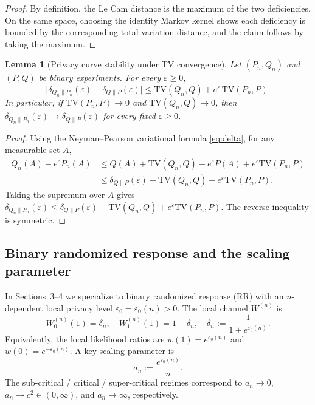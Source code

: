 \documentclass{article}
\newtheorem{lemma}[theorem]{Lemma}
\begin{document}
\begin{proof}
By definition, the Le Cam distance is the maximum of the two deficiencies. On the same space,
choosing the identity Markov kernel shows each deficiency is bounded by the corresponding total
variation distance, and the claim follows by taking the maximum.
\end{proof}

\begin{lemma}[Privacy curve stability under TV convergence]
\label{lem:privacy-curve-stability}
Let $(P_n, Q_n)$ and $(P, Q)$ be binary experiments. For every $\varepsilon \geq 0$,
\[
\bigl|\delta_{Q_n\|P_n}(\varepsilon) - \delta_{Q\|P}(\varepsilon)\bigr|
\leq \mathrm{TV}(Q_n, Q) + e^\varepsilon\,\mathrm{TV}(P_n, P).
\]
In particular, if $\mathrm{TV}(P_n, P) \to 0$ and $\mathrm{TV}(Q_n, Q) \to 0$, then
$\delta_{Q_n\|P_n}(\varepsilon) \to \delta_{Q\|P}(\varepsilon)$ for every fixed $\varepsilon \geq 0$.
\end{lemma}

\begin{proof}
Using the Neyman--Pearson variational formula \eqref{eq:delta}, for any measurable set $A$,
\begin{align*}
Q_n(A) - e^\varepsilon P_n(A)
&\leq Q(A) + \mathrm{TV}(Q_n,Q) - e^\varepsilon P(A) + e^\varepsilon\mathrm{TV}(P_n,P)\\
&\leq \delta_{Q\|P}(\varepsilon) + \mathrm{TV}(Q_n,Q) + e^\varepsilon\mathrm{TV}(P_n,P).
\end{align*}
Taking the supremum over $A$ gives $\delta_{Q_n\|P_n}(\varepsilon) \leq \delta_{Q\|P}(\varepsilon) + \mathrm{TV}(Q_n,Q) + e^\varepsilon\mathrm{TV}(P_n,P)$.
The reverse inequality is symmetric.
\end{proof}

\subsection{Binary randomized response and the scaling parameter}

In Sections~3--4 we specialize to binary randomized response (RR) with an $n$-dependent local privacy
level $\varepsilon_0 = \varepsilon_0(n) > 0$. The local channel $W^{(n)}$ is
\[
W^{(n)}_0(1) = \delta_n, \quad W^{(n)}_1(1) = 1 - \delta_n, \quad \delta_n := \frac{1}{1 + e^{\varepsilon_0(n)}}.
\]
Equivalently, the local likelihood ratios are $w(1) = e^{\varepsilon_0(n)}$ and $w(0) = e^{-\varepsilon_0(n)}$. A key scaling
parameter is
\begin{equation}
a_n := \frac{e^{\varepsilon_0(n)}}{n}. \label{eq:an}
\end{equation}
The sub-critical / critical / super-critical regimes correspond to $a_n \to 0$, $a_n \to c^2 \in (0, \infty)$, and
$a_n \to \infty$, respectively.
\end{document}
